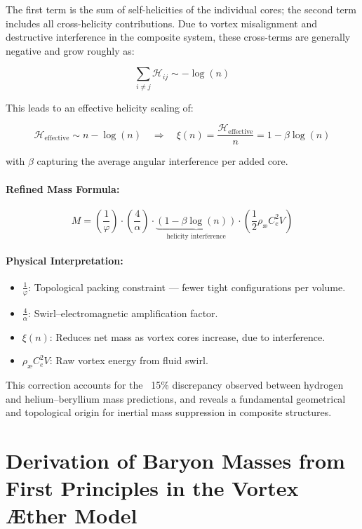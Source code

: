 \documentclass[12pt]{article}
\begin{document}
The first term is the sum of self-helicities of the individual cores; the second term includes all cross-helicity contributions. Due to vortex misalignment and destructive interference in the composite system, these cross-terms are generally negative and grow roughly as:

\[
\sum_{i \neq j} \mathcal{H}_{ij} \sim -\log(n)
\]

This leads to an effective helicity scaling of:

\[
\mathcal{H}_{\text{effective}} \sim n - \log(n)
\quad \Rightarrow \quad
\xi(n) = \frac{\mathcal{H}_{\text{effective}}}{n} = 1 - \beta \log(n)
\]

with \( \beta \) capturing the average angular interference per added core.

\paragraph{Refined Mass Formula:}

\begin{equation}
\boxed{
M = \left( \frac{1}{\varphi} \right) \cdot \left( \frac{4}{\alpha} \right) \cdot \underbrace{\left(1 - \beta \log(n)\right)}_{\text{helicity interference}} \cdot \left( \frac{1}{2} \rho_\text{\ae} C_e^2 V \right)
}
\end{equation}

\paragraph{Physical Interpretation:}
\begin{itemize}
  \item \( \frac{1}{\varphi} \): Topological packing constraint — fewer tight configurations per volume.
  \item \( \frac{4}{\alpha} \): Swirl–electromagnetic amplification factor.
  \item \( \xi(n) \): Reduces net mass as vortex cores increase, due to interference.
  \item \( \rho_\text{\ae} C_e^2 V \): Raw vortex energy from fluid swirl.
\end{itemize}

\noindent
This correction accounts for the ~15\% discrepancy observed between hydrogen and helium–beryllium mass predictions, and reveals a fundamental geometrical and topological origin for inertial mass suppression in composite structures.

\section*{Derivation of Baryon Masses from First Principles in the Vortex Æther Model}
\end{document}
